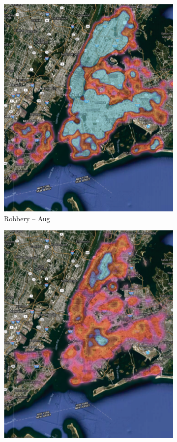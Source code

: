 \begin{figure}[t]
\begin{subfigure}{0.24\textwidth}
\includegraphics[width=0.9\linewidth]{Chapter5/Images/robbery.png}
\caption{Robbery – Aug}
\label{fig:subim2}
\end{subfigure}
\begin{subfigure}{0.24\textwidth}
\centering
\includegraphics[width=0.9\linewidth]{Chapter5/Images/felony.png}

\end{subfigure}
\end{figure}
